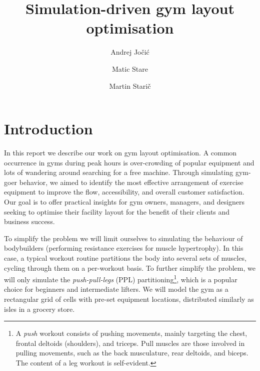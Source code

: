 \documentclass[9pt]{pnas-new}
\title{Simulation-driven gym layout optimisation}
\author{Andrej Jočić}
\author{Matic Stare}
\author{Martin Starič}
\affil{Collective behaviour course research seminar report}
\begin{document}
\verticaladjustment{-2pt}

\maketitle
\thispagestyle{firststyle}

\section*{Introduction}
In this report we describe our work on gym layout optimisation.
A common occurrence in gyms during peak hours is over-crowding of popular equipment and lots of wandering around searching for a free machine.
Through simulating gym-goer behavior, we aimed to identify the most effective arrangement of exercise equipment to improve the flow, accessibility, and overall customer satisfaction.
Our goal is to offer practical insights for gym owners, managers, and designers seeking to optimise their facility layout for the benefit of their clients and business success.

To simplify the problem
we will limit ourselves to simulating the behaviour of bodybuilders (performing resistance exercises for muscle hypertrophy).
In this case, a typical workout routine partitions the body into several sets of muscles, cycling through them on a per-workout basis.
To further simplify the problem, we will only simulate the
\textit{push-pull-legs} (PPL) partitioning\footnote{
    A {\it push} workout consists of pushing movements, mainly targeting the
    chest, frontal deltoids (shoulders), and triceps. Pull muscles are those involved in pulling movements, such as the back musculature, rear deltoids, and biceps. The content of a leg workout is self-evident.
}, which is a popular choice for beginners and intermediate lifters.
We will model the gym as a rectangular grid of cells with pre-set equipment locations, distributed similarly as isles in a grocery store.
\end{document}
